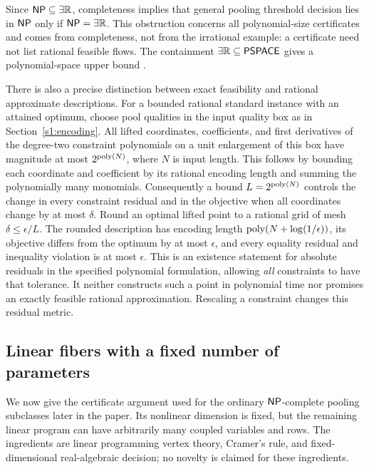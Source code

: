 Since $\mathsf{NP}\subseteq\exists\mathbb R$, completeness implies that general pooling
threshold decision lies in $\mathsf{NP}$ only if $\mathsf{NP}=\exists\mathbb R$. This obstruction
concerns all polynomial-size certificates and comes from completeness,
not from the irrational example: a certificate need not list rational
feasible flows. The containment $\exists\mathbb R\subseteq\mathsf{PSPACE}$ gives a
polynomial-space upper bound
\citep[Section~1.1]{abrahamsen2019-dynamic-toolbox-for-etrinv}.

There is also a precise distinction between exact feasibility and
rational approximate descriptions. For a bounded rational standard
instance with an attained optimum, choose pool qualities in the input
quality box as in Section~\ref{s1:encoding}. All lifted coordinates,
coefficients, and first derivatives of the degree-two constraint
polynomials on a unit enlargement of this box have magnitude at most
$2^{\operatorname{poly}(N)}$, where $N$ is input length. This follows by bounding
each coordinate and coefficient by its rational encoding length and
summing the polynomially many monomials. Consequently a bound
$L=2^{\operatorname{poly}(N)}$ controls the change in every constraint residual and
in the objective when all coordinates change by at most $\delta$.
Round an optimal lifted point to a rational grid of mesh
$\delta\le\epsilon/L$. The rounded description has encoding length
$\operatorname{poly}(N+\log(1/\epsilon))$, its objective differs from the optimum
by at most $\epsilon$, and every equality residual and inequality
violation is at most $\epsilon$. This is an existence statement for
absolute residuals in the specified polynomial formulation, allowing
\emph{all} constraints to have that tolerance. It neither constructs
such a point in polynomial time nor promises an exactly feasible
rational approximation. Rescaling a constraint changes this residual
metric.

\subsection{Linear fibers with a fixed number of parameters}\label{s2:fibers}

We now give the certificate argument used for the ordinary
$\mathsf{NP}$-complete pooling subclasses later in the paper. Its nonlinear
dimension is fixed, but the remaining linear program can have
arbitrarily many coupled variables and rows. The ingredients are
linear programming vertex theory, Cramer's rule, and fixed-dimensional
real-algebraic decision; no novelty is claimed for these ingredients.

